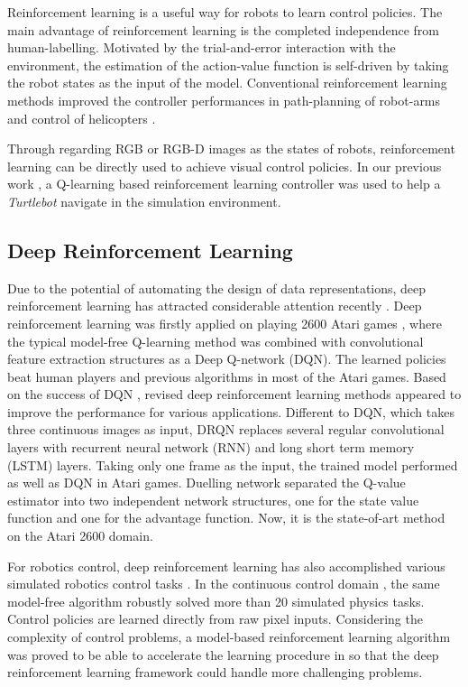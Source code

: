 Reinforcement learning is a useful way for robots to learn control policies. The main advantage of reinforcement learning is the completed independence from human-labelling. Motivated by the trial-and-error interaction with the environment, the estimation of the action-value function is self-driven by taking the robot states as the input of the model. Conventional reinforcement learning methods improved the controller performances in path-planning of robot-arms \cite{xie2015model} and control of helicopters \cite{ng2006autonomous}.

Through regarding RGB or RGB-D images as the states of robots, reinforcement learning can be directly used to achieve visual control policies. In our previous work \cite{tl_rcar_2016}, a Q-learning based reinforcement learning controller was used to help a \textit{Turtlebot} navigate in the simulation environment.

\subsection{Deep Reinforcement Learning}

Due to the potential of automating the design of data representations, deep reinforcement learning has attracted considerable attention recently \cite{duan2016benchmarking}. Deep reinforcement learning was firstly applied on playing 2600 Atari games \cite{mnih2015human}, where the typical model-free Q-learning method was combined with convolutional feature extraction structures as a Deep Q-network (DQN). The learned policies beat human players and previous algorithms in most of the Atari games. Based on the success of DQN \cite{mnih2015human}, revised deep reinforcement learning methods appeared to improve the performance for various applications. Different to DQN, which takes three continuous images as input, DRQN \cite{hausknecht2015deep} replaces several regular convolutional layers with recurrent neural network (RNN) and long short term memory (LSTM) layers. Taking only one frame as the input, the trained model performed as well as DQN in Atari games. Duelling network \cite{wang2015dueling} separated the Q-value estimator into two independent network structures, one for the state value function and one for the advantage function. Now, it is the state-of-art method on the Atari 2600 domain.

For robotics control, deep reinforcement learning has also accomplished various simulated robotics control tasks \cite{lillicrap2015continuous}. In the continuous control domain \cite{gu2016continuous}, the same model-free algorithm robustly solved more than 20 simulated physics tasks. Control policies are learned directly from raw pixel inputs. Considering the complexity of control problems, a model-based reinforcement learning algorithm was proved to be able to accelerate the learning procedure in \cite{lillicrap2015continuous} so that the deep reinforcement learning framework could handle more challenging problems.

